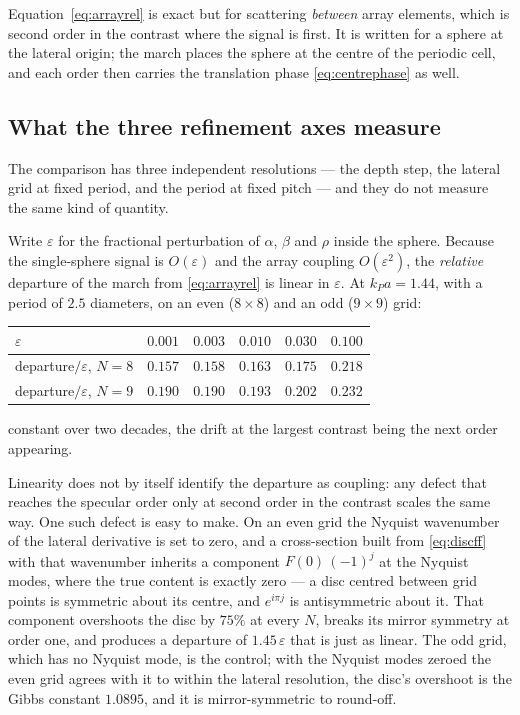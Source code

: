 \documentclass[11pt,a4paper]{article}
\begin{document}
Equation~\eqref{eq:arrayrel} is exact but for scattering \emph{between} array
elements, which is second order in the contrast where the signal is first.
It is written for a sphere at the lateral origin; the march places the sphere
at the centre of the periodic cell, and each order then carries the translation
phase \eqref{eq:centrephase} as well.

\subsection{What the three refinement axes measure}

The comparison has three independent resolutions --- the depth step, the lateral
grid at fixed period, and the period at fixed pitch --- and they do not measure
the same kind of quantity.

Write $\varepsilon$ for the fractional perturbation of $\alpha$, $\beta$ and
$\rho$ inside the sphere.  Because the single-sphere signal is $O(\varepsilon)$
and the array coupling $O(\varepsilon^2)$, the \emph{relative} departure of the
march from \eqref{eq:arrayrel} is linear in $\varepsilon$.  At $k_Pa=1.44$, with
a period of $2.5$ diameters, on an even ($8\times8$) and an odd ($9\times9$)
grid:
\begin{center}
\begin{tabular}{@{}lccccc@{}}
\toprule
$\varepsilon$ & $0.001$ & $0.003$ & $0.010$ & $0.030$ & $0.100$ \\
\midrule
departure$/\varepsilon$, $N=8$ & $0.157$ & $0.158$ & $0.163$ & $0.175$ & $0.218$ \\
departure$/\varepsilon$, $N=9$ & $0.190$ & $0.190$ & $0.193$ & $0.202$ & $0.232$ \\
\bottomrule
\end{tabular}
\end{center}
constant over two decades, the drift at the largest contrast being the next
order appearing.

Linearity does not by itself identify the departure as coupling: any defect that
reaches the specular order only at second order in the contrast scales the same
way.  One such defect is easy to make.  On an even grid the Nyquist wavenumber
of the lateral derivative is set to zero, and a cross-section built from
\eqref{eq:discff} with that wavenumber inherits a component
$F(0)\,(-1)^j$ at the Nyquist modes, where the true content is exactly zero ---
a disc centred between grid points is symmetric about its centre, and
$e^{i\pi j}$ is antisymmetric about it.  That component overshoots the disc by
$75\%$ at every $N$, breaks its mirror symmetry at order one, and produces a
departure of $1.45\,\varepsilon$ that is just as linear.  The odd grid, which has
no Nyquist mode, is the control; with the Nyquist modes zeroed the even grid
agrees with it to within the lateral resolution, the disc's overshoot is the
Gibbs constant $1.0895$, and it is mirror-symmetric to round-off.
\end{document}
